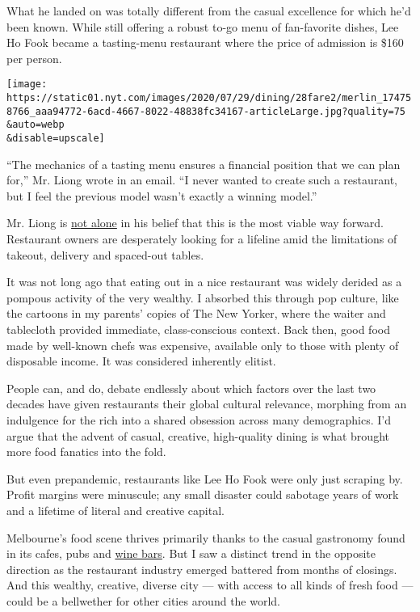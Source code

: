 What he landed on was totally different from the casual excellence for
which he'd been known. While still offering a robust to-go menu of
fan-favorite dishes, Lee Ho Fook became a tasting-menu restaurant where
the price of admission is \$160 per person.

\texttt{[image: https://static01.nyt.com/images/2020/07/29/dining/28fare2/merlin\_174758766\_aaa94772-6acd-4667-8022-48838fc34167-articleLarge.jpg?quality=75\\\&auto=webp\\\&disable=upscale]}

``The mechanics of a tasting menu ensures a financial position that we
can plan for,'' Mr. Liong wrote in an email. ``I never wanted to create
such a restaurant, but I feel the previous model wasn't exactly a
winning model.''

Mr. Liong is
\href{https://www.nytimes.com/2020/07/28/dining/ever-chicago-restaurant-coronavirus.html}{not
alone} in his belief that this is the most viable way forward.
Restaurant owners are desperately looking for a lifeline amid the
limitations of takeout, delivery and spaced-out tables.

It was not long ago that eating out in a nice restaurant was widely
derided as a pompous activity of the very wealthy. I absorbed this
through pop culture, like the cartoons in my parents' copies of The New
Yorker, where the waiter and tablecloth provided immediate,
class-conscious context. Back then, good food made by well-known chefs
was expensive, available only to those with plenty of disposable income.
It was considered inherently elitist.

People can, and do, debate endlessly about which factors over the last
two decades have given restaurants their global cultural relevance,
morphing from an indulgence for the rich into a shared obsession across
many demographics. I'd argue that the advent of casual, creative,
high-quality dining is what brought more food fanatics into the fold.

But even prepandemic, restaurants like Lee Ho Fook were only just
scraping by. Profit margins were minuscule; any small disaster could
sabotage years of work and a lifetime of literal and creative capital.

Melbourne's food scene thrives primarily thanks to the casual gastronomy
found in its cafes, pubs and
\href{https://www.nytimes.com/2019/10/30/dining/melbourne-wine-bars-restaurants.html}{wine
bars}. But I saw a distinct trend in the opposite direction as the
restaurant industry emerged battered from months of closings. And this
wealthy, creative, diverse city --- with access to all kinds of fresh
food --- could be a bellwether for other cities around the world.

